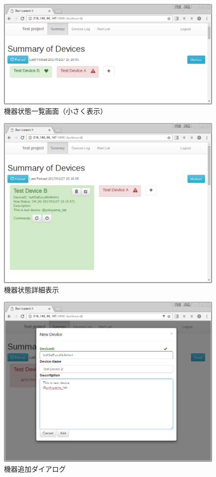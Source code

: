 \begin{figure}[htbp]
\includegraphics[width=16cm]{images/screenshot_summary2.png}
\caption{機器状態一覧画面（小さく表示）}
\label{fig:ss_sum2}
\end{figure}

\begin{figure}[htbp]
\includegraphics[width=16cm]{images/screenshot_more.png}
\caption{機器状態詳細表示}
\label{fig:ss_more}
\end{figure}

\begin{figure}[htbp]
\includegraphics[width=16cm]{images/screenshot_add.png}
\caption{機器追加ダイアログ}
\label{fig:ss_add}
\end{figure}


